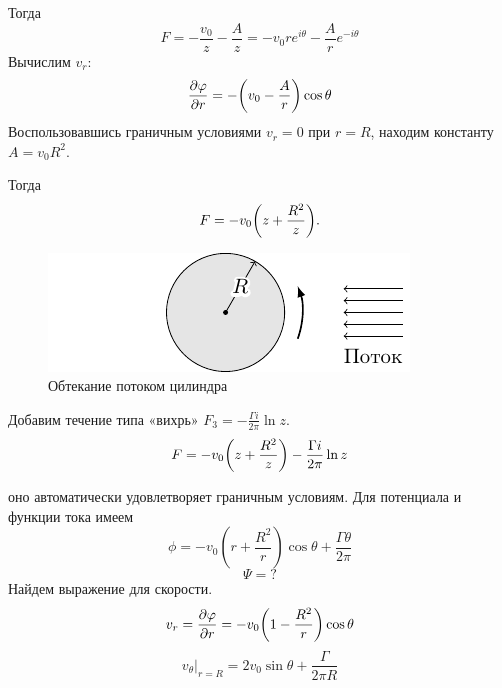 Тогда
 $$ F=-\frac{v_0}{z}-\frac{A}{z}=-v_0r e^{i\theta} -\frac{A}{r} e^{-i\theta}$$
Вычислим $v_r$:
\begin{equation}
	\pdv{\varphi}{r}=-\qty(v_0-\frac{A}{r})\cos\theta
\end{equation}
Воспользовавшись граничным условиями $v_r=0$ при $r=R$, находим константу $A=v_0R^2$.

Тогда
\begin{equation}
	F=-v_0\qty(z+\frac{R^2}{z}).
\end{equation}
\begin{figure}[h!]
    \centering
	\includegraphics[scale=1.5]{img/cyl2}
    \caption{Обтекание потоком цилиндра}
    \label{fig:figure1}
\end{figure}

Добавим течение типа «вихрь» $F_3=-\frac{\Gamma i}{2\pi}\ln{z}$.
\begin{equation}
	F=-v_0\qty(z+\frac{R^2}{z})-\frac{\Gamma i}{2\pi}\ln{z}
\end{equation}

оно автоматически удовлетворяет граничным условиям. Для
потенциала и функции тока имеем
$$\phi = -v_0 \left( r+\frac{R^2}{r}\right)\cos\theta + \frac{\Gamma \theta}{2\pi}$$
$$\Psi=?$$
Найдем выражение для скорости.
\begin{equation}
	v_r=\pdv{\varphi}{r}=-v_0\qty(1-\frac{R^2}{r})\cos\theta
\end{equation}
\begin{equation}
	v_\theta\bigg|_{r=R}=2v_0\sin\theta+\frac{\Gamma}{2\pi R}
\end{equation}

